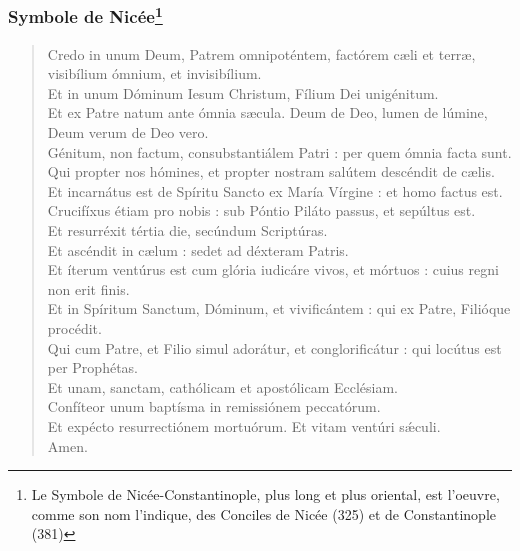 \subsubsection*{Symbole de Nicée\footnote{Le Symbole de Nicée-Constantinople, 
plus long et plus oriental, est l’oeuvre, comme son nom l’indique, des Conciles 
de Nicée (325) et de Constantinople (381)}}
\begin{verse}
 Credo in unum Deum, Patrem omnipoténtem, fact\'orem cæli et terræ, visibílium \'omnium, et invisibílium. \\
 Et in unum D\'ominum Iesum Christum, Fílium Dei unigénitum. \\
 Et ex Patre natum ante \'omnia sæcula. Deum de Deo, lumen de lúmine, Deum verum de Deo vero. \\
 Génitum, non factum, consubstantiálem Patri : per quem \'omnia facta sunt. \\
 Qui propter nos h\'omines, et propter nostram salútem descéndit de cælis. \\
 Et incarnátus est de Spíritu Sancto ex María Vírgine : et homo factus est. \\
 Crucifíxus étiam pro nobis : sub P\'ontio Piláto passus, et sepúltus est. \\
 Et resurréxit tértia die, secúndum Scriptúras. \\
 Et ascéndit in cælum : sedet ad déxteram Patris. \\
 Et íterum ventúrus est cum gl\'oria iudicáre vivos, et m\'ortuos : cuius regni non erit finis. \\
 Et in Spíritum Sanctum, D\'ominum, et vivificántem : qui ex Patre, Fili\'oque procédit. \\
 Qui cum Patre, et Filio simul adorátur, et conglorificátur : qui locútus est per Prophétas. \\
 Et unam, sanctam, cath\'olicam et apost\'olicam Ecclésiam. \\
 Confíteor unum baptísma in remissi\'onem peccat\'orum. \\
 Et expécto resurrecti\'onem mortu\'orum. Et vitam ventúri s\'\ae{}culi.\\
 Amen.
\end{verse}

